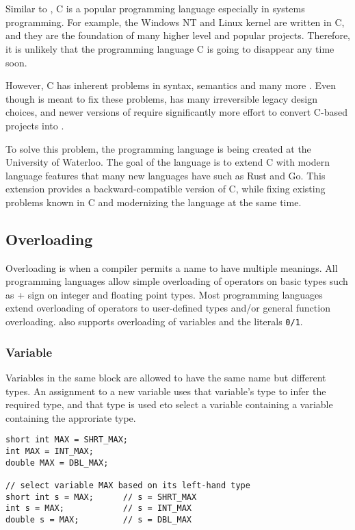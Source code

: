 \chapter{\CFA} \label{CFA}
Similar to \CC, C is a popular programming language especially in systems
programming. For example, the Windows NT and Linux kernel are written in C, and they are the foundation of many higher level
and popular projects. Therefore, it is unlikely that the programming language C is
going to disappear any time soon.

However, C has inherent problems in syntax, semantics and many
more \cite{reference2}. Even though \CCS is meant to fix these problems, \CCS has many
irreversible legacy design choices, and newer versions of \CCS require significantly more effort to convert C-based projects into \CCS.

To solve this problem, the programming language \CFAS is being created at the University of Waterloo. The goal
of the language is to extend C with modern language features that many new
languages have such as Rust and Go. This extension provides a
backward-compatible version of C, while fixing existing problems known in C and
modernizing the language at the same time.

\section{Overloading}
Overloading is when a compiler permits a name to have multiple meanings. All
programming languages allow simple overloading of operators on basic types such
as + sign on integer and floating point types. Most programming languages extend
overloading of operators to user-defined types and/or general function
overloading. \CFAS also supports overloading of variables and the literals \verb|0/1|.

\subsection{Variable}
Variables in the same block are allowed to have the same name but different
types. An assignment to a new variable uses that variable's type to infer the
required type, and that type is used eto select a variable containing a variable
containing the approriate type.

\begin{lstlisting}[style=C++nokeyword, caption={Overloading variables in \CFA}, label={CFA-overload-var}]
short int MAX = SHRT_MAX;
int MAX = INT_MAX;
double MAX = DBL_MAX;

// select variable MAX based on its left-hand type
short int s = MAX;      // s = SHRT_MAX
int s = MAX;            // s = INT_MAX
double s = MAX;         // s = DBL_MAX
\end{lstlisting}

